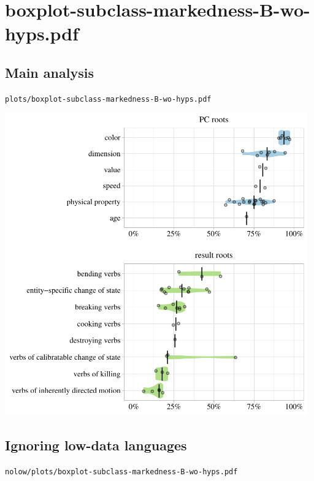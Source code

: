\eject

\section{boxplot-subclass-markedness-B-wo-hyps.pdf}

\subsection{Main analysis}

\texttt{plots/boxplot-subclass-markedness-B-wo-hyps.pdf}

\includegraphics[width=0.98\textwidth]{../plots/boxplot-subclass-markedness-B-wo-hyps.pdf}

\subsection{Ignoring low-data languages}

\texttt{nolow/plots/boxplot-subclass-markedness-B-wo-hyps.pdf}

